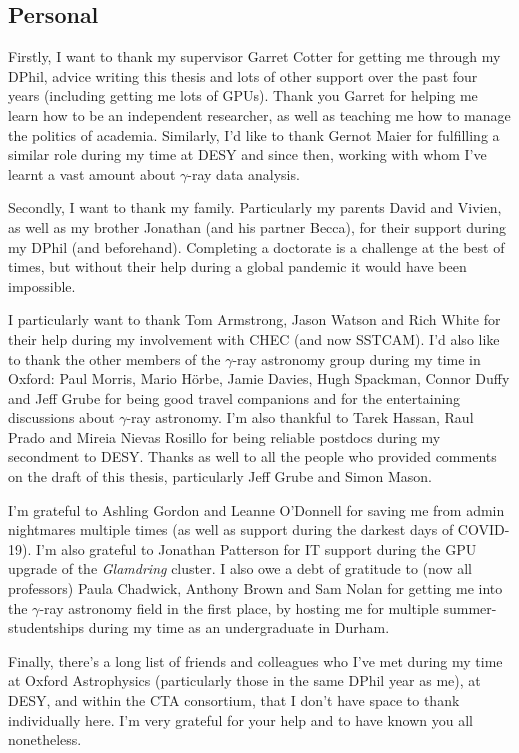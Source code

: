 \subsection*{Personal}

Firstly, I want to thank my supervisor Garret Cotter for getting me through my DPhil, advice writing this thesis and lots of other support over the past four years (including getting me lots of GPUs). Thank you Garret for helping me learn how to be an independent researcher, as well as teaching me how to manage the politics of academia. Similarly, I'd like to thank Gernot Maier for fulfilling a similar role during my time at DESY and since then, working with whom I've learnt a vast amount about $\gamma$-ray data analysis.

Secondly, I want to thank my family. Particularly my parents David and Vivien, as well as my brother Jonathan (and his partner Becca), for their support during my DPhil (and beforehand). Completing a doctorate is a challenge at the best of times, but without their help during a global pandemic it would have been impossible.

I particularly want to thank Tom Armstrong, Jason Watson and Rich White for their help during my involvement with CHEC (and now SSTCAM). I'd also like to thank the other members of the $\gamma$-ray astronomy group during my time in Oxford: Paul Morris, Mario H\"{o}rbe, Jamie Davies, Hugh Spackman, Connor Duffy and Jeff Grube for being good travel companions and for the entertaining discussions about $\gamma$-ray astronomy. I’m also thankful to Tarek Hassan, Raul Prado and Mireia Nievas Rosillo for being reliable postdocs during my secondment to DESY. Thanks as well to all the people who provided comments on the draft of this thesis, particularly Jeff Grube and Simon Mason.

I’m grateful to Ashling Gordon and Leanne O’Donnell for saving me from admin nightmares multiple times (as well as support during the darkest days of COVID-19). I'm also grateful to Jonathan Patterson for IT support during the GPU upgrade of the \textit{Glamdring} cluster. I also owe a debt of gratitude to (now all professors) Paula Chadwick, Anthony Brown and Sam Nolan for getting me into the $\gamma$-ray astronomy field in the first place, by hosting me for multiple summer-studentships during my time as an undergraduate in Durham.

Finally, there’s a long list of friends and colleagues who I’ve met during my time at Oxford Astrophysics (particularly those in the same DPhil year as me), at DESY, and within the CTA consortium, that I don’t have space to thank individually here. I’m very grateful for your help and to have known you all nonetheless.

